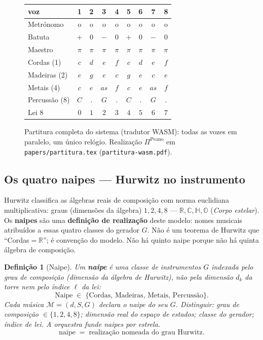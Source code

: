 \documentclass[11pt,a4paper]{article}
\newtheorem{definicao}{Definição}
\newcommand{\code}[1]{\texttt{#1}}
\begin{document}
\begin{figure}[ht]
\centering
\begin{center}\small
\begin{tabular}{@{}lcccccccc@{}}
voz & 1 & 2 & 3 & 4 & 5 & 6 & 7 & 8 \\
\midrule
Metrónomo & o & o & o & o & o & o & o & o \\
Batuta & $+$ & $0$ & $-$ & $0$ & $+$ & $0$ & $-$ & $0$ \\
Maestro & $\pi$ & $\pi$ & $\pi$ & $\pi$ & $\pi$ & $\pi$ & $\pi$ & $\pi$ \\
Cordas (1) & $c$ & $d$ & $e$ & $f$ & $c$ & $d$ & $e$ & $f$ \\
Madeiras (2) & $e$ & $g$ & $e$ & $c$ & $g$ & $e$ & $c$ & $e$ \\
Metais (4) & $c$ & $e$ & $as$ & $f$ & $c$ & $e$ & $as$ & $f$ \\
Percussão (8) & $C$ & . & $G$ & . & $C$ & . & $G$ & . \\
Lei 8 & $0$ & $1$ & $2$ & $3$ & $4$ & $5$ & $6$ & $7$ \\
\bottomrule
\end{tabular}
\end{center}
\caption{Partitura completa do sistema (tradutor WASM): todas as vozes em
paralelo, um único relógio. Realização
$\Pi^{\mathrm{Peano}}$ em \code{papers/partitura.tex}
(\code{partitura-wasm.pdf}).}
\label{fig:partitura-sistema}
\end{figure}

\subsection*{Os quatro naipes --- Hurwitz no instrumento}

Hurwitz classifica as álgebras reais de composição com norma
euclidiana multiplicativa: graus (dimensões da álgebra)
$1,2,4,8$ --- $\mathbb{R},\mathbb{C},\mathbb{H},\mathbb{O}$
(\emph{Corpo estelar}). Os \textbf{naipes} são uma
\textbf{definição de realização} deste modelo: nomes musicais
atribuídos a essas quatro classes do gerador $G$. Não é um teorema de
Hurwitz que ``Cordas$=\mathbb{R}$''; é convenção do modelo. Não há
quinto naipe porque não há quinta álgebra de composição.

\begin{definicao}[Naipe]\label{def:naipe}
Um \textbf{naipe} é uma classe de instrumentos $G$ indexada pelo
\emph{grau de composição} (dimensão da álgebra de Hurwitz), não pela
dimensão $d_k$ da torre nem pelo índice $\ell$ da lei:
\[
\mathrm{Naipe}\;\in\;\{\text{Cordas},\,\text{Madeiras},\,\text{Metais},\,\text{Percussão}\}.
\]
Cada música $\mathcal{M}=(d,S,G)$ declara o naipe do seu $G$. Distinguir:
grau de composição $\in\{1,2,4,8\}$; dimensão real do espaço de estados;
classe do gerador; índice de lei. A orquestra funde naipes por estrela.
\[
\boxed{\text{naipe}\;=\;\text{realização nomeada do grau Hurwitz}.}
\]
\end{definicao}
\end{document}
